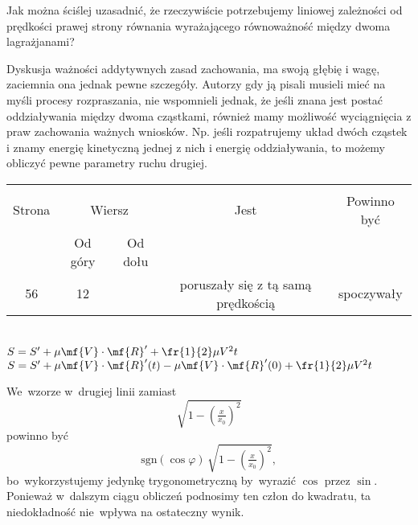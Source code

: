 \documentclass[a4paper,11pt]{article}
\begin{document}
\start {} Jak można ściślej uzasadnić, że rzeczywiście
potrzebujemy liniowej zależności od prędkości prawej strony równania
wyrażającego równoważność między dwoma lagrażjanami? \Dok

\start {} Dyskusja ważności addytywnych zasad zachowania, ma
swoją głębię i wagę, zaciemnia ona jednak pewne szczegóły. Autorzy gdy
ją pisali musieli mieć na myśli procesy rozpraszania, nie wspomnieli
jednak, że jeśli znana jest postać oddziaływania między dwoma
cząstkami, również mamy możliwość wyciągnięcia z praw zachowania
ważnych wniosków. Np. jeśli rozpatrujemy układ dwóch cząstek i znamy
energię kinetyczną jednej z nich i energię oddziaływania, to możemy
obliczyć pewne parametry ruchu drugiej.


\begin{center}
  \begin{tabular}{|c|c|c|c|c|}
    \hline
    & \multicolumn{2}{c|}{} & & \\
    Strona & \multicolumn{2}{c|}{Wiersz} & Jest
                              & Powinno być \\ \cline{2-3}
    & Od góry & Od dołu & & \\
    \hline
    56  & 12 & & poruszały się z tą samą prędkością & spoczywały \\
    \hline
  \end{tabular}
\end{center}
\noi
{} \\
\Jest $S = S' + \mu \mf{V} \cdot \mf{R}' + \fr{ 1 }{ 2 } \mu V^{ 2 } t$ \\
\Pow $S = S' + \mu \mf{V} \cdot \mf{R}'( t ) - \mu \mf{V} \cdot
\mf{R}'( 0 ) + \fr{ 1 }{ 2 } \mu V^{ 2 } t$ \\

\vspace{\spaceTwo}








\start {} We~wzorze w~drugiej linii zamiast
\begin{displaymath}
  \sqrt{1 - \left( \tfrac{ x }{ x_{ 0 } } \right)^{ 2 } }
\end{displaymath}
powinno być
\begin{displaymath}
  \mathrm{sgn}( \cos \varphi ) \, \sqrt{1 - \left( \tfrac{ x }{ x_{ 0 } }
    \right)^{ 2 } },
\end{displaymath}
bo~wykorzystujemy jedynkę trygonometryczną by~wyrazić $\cos$ przez
$\sin$. Ponieważ w~dalszym ciągu obliczeń podnosimy ten człon do
kwadratu, ta niedokładność nie~wpływa na ostateczny wynik.
\end{document}
